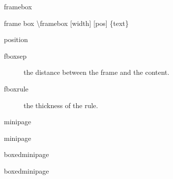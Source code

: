 \documentclass[ aspectratio=149,  14pt,blue,xcolor=pdftex,dvipsnames,table,handout,notes]{beamer}
\begin{document}
		\begin{frame}[t]{framebox}



			\begin{block} {frame box}
			\textbackslash framebox [width] [pos] \{text\}
			\end{block}

			\begin{block} {position}
				\begin{description}
				\item	[fboxsep]  the distance between the frame and the content.
				\item	[fboxrule] the thickness of the rule.
				\end{description}
			\end{block}



		
		\end{frame}


		\begin{frame}[t]{minipage}


			\begin{block} {minipage}
			\end{block}

		
		\end{frame}





		
		\begin{frame}[t]{boxedminipage}

			\begin{block} {boxedminipage}
			\end{block}

			\begin{example}
			\end{example}


		
		\end{frame}
\end{document}
